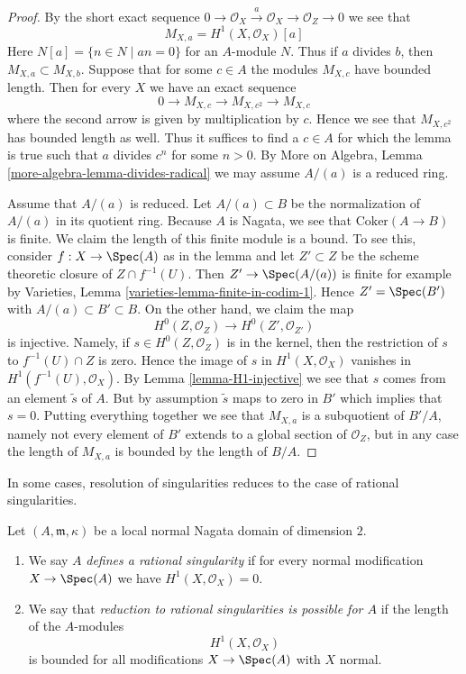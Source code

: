 \begin{proof}
By the short exact sequence
$
0 \to \mathcal{O}_X \xrightarrow{a} \mathcal{O}_X \to \mathcal{O}_Z \to 0
$
we see that
\begin{equation}
\label{equation-a-torsion}
M_{X, a} = H^1(X, \mathcal{O}_X)[a]
\end{equation}
Here $N[a] = \{n \in N \mid an = 0\}$ for an $A$-module $N$. Thus
if $a$ divides $b$, then $M_{X, a} \subset M_{X, b}$.
Suppose that for some $c \in A$ the modules $M_{X, c}$
have bounded length. Then for every $X$ we have an exact sequence
$$
0 \to M_{X, c} \to M_{X, c^2} \to M_{X, c}
$$
where the second arrow is given by multiplication by $c$. Hence we see that
$M_{X, c^2}$ has bounded length as well. Thus it suffices to find a $c \in A$
for which the lemma is true such that $a$ divides $c^n$ for some $n > 0$.
By More on Algebra, Lemma \ref{more-algebra-lemma-divides-radical}
we may assume $A/(a)$ is a reduced ring.

\medskip\noindent
Assume that $A/(a)$ is reduced. Let $A/(a) \subset B$ be the normalization
of $A/(a)$ in its quotient ring. Because $A$ is Nagata, we see that
$\text{Coker}(A \to B)$ is finite. We claim the length of this finite
module is a bound. To see this, consider $f : X \to \Spec(A)$ as in the lemma
and let $Z' \subset Z$ be the scheme theoretic closure of $Z \cap f^{-1}(U)$.
Then $Z' \to \Spec(A/(a))$ is finite for example by Varieties, Lemma
\ref{varieties-lemma-finite-in-codim-1}.
Hence $Z' = \Spec(B')$ with $A/(a) \subset B' \subset B$.
On the other hand, we claim the map
$$
H^0(Z, \mathcal{O}_Z) \to H^0(Z', \mathcal{O}_{Z'})
$$
is injective. Namely, if $s \in H^0(Z, \mathcal{O}_Z)$
is in the kernel, then
the restriction of $s$ to $f^{-1}(U) \cap Z$ is zero.
Hence the image of $s$ in $H^1(X, \mathcal{O}_X)$ vanishes in
$H^1(f^{-1}(U), \mathcal{O}_X)$. By Lemma \ref{lemma-H1-injective}
we see that $s$ comes from an element $\tilde s$ of $A$. But by
assumption $\tilde s$ maps to zero in $B'$ which implies that $s = 0$.
Putting everything together we see that
$M_{X, a}$ is a subquotient of $B'/A$, namely not every element
of $B'$ extends to a global section of $\mathcal{O}_Z$, but in
any case the length of $M_{X, a}$ is bounded by the length of $B/A$.
\end{proof}

\noindent
In some cases, resolution of singularities reduces to the case
of rational singularities.

\begin{definition}
\label{definition-reduce-to-rational}
Let $(A, \mathfrak m, \kappa)$ be a local normal Nagata domain
of dimension $2$.
\begin{enumerate}
\item We say $A$ {\it defines a rational singularity} if for every
normal modification $X \to \Spec(A)$ we have $H^1(X, \mathcal{O}_X) = 0$.
\item We say that {\it reduction to rational singularities
is possible for $A$} if the length of the $A$-modules
$$
H^1(X, \mathcal{O}_X)
$$
is bounded for all modifications $X \to \Spec(A)$ with $X$ normal.
\end{enumerate}
\end{definition}

